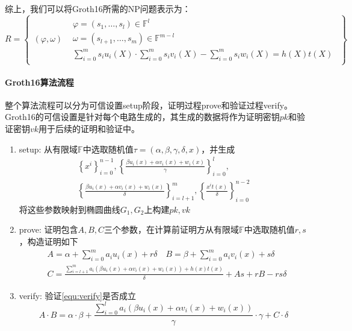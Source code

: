 综上，我们可以将Groth16所需的NP问题表示为：
\begin{equation}
    R = \left \{ \begin{array}{c|l}
        (\varphi, \omega) 
        & \begin{array}{l}
            \varphi = (s_1, \dots, s_l) \in \mathbb{F}^l \\ 
            \omega = (s_{l+1}, \dots, s_m) \in \mathbb{F}^{m-l} \\
            \sum\limits_{i=0}^m s_i u_i(X) \cdot \sum\limits_{i=0}^m s_i v_i(X) - \sum\limits_{i=0}^m s_i w_i(X) = h(X)t(X)
        \end{array}
    \end{array} \right \}
\end{equation}
\paragraph{Groth16算法流程} 整个算法流程可以分为可信设置setup阶段，证明过程prove和验证过程verify。Groth16的可信设置是针对每个电路生成的，其生成的数据将作为证明密钥$pk$和验证密钥$vk$用于后续的证明和验证中。
\begin{enumerate}
    \item setup: 从有限域$\mathbb{F}$中选取随机值$\tau = (\alpha, \beta, \gamma, \delta, x)$，并生成
    \begin{equation}
        \begin{split}
        \left \{x^i \right \}_{i=0}^{n-1}, 
        \left \{ \frac{\beta u_i(x)+\alpha v_i(x) + w_i(x)}{\gamma}\right \}_{i=0}^l, 
        \\
        \left \{ \frac{\beta u_i(x)+\alpha v_i(x) + w_i(x)}{\delta}\right \}_{i=l+1}^m,
        \left \{ \frac{x^i t(x)}{\delta}\right \}_{i=0}^{n-2}
    \end{split}
    \end{equation}
    将这些参数映射到椭圆曲线$G_1, G_2$上构建$pk, vk$
    \item prove: 证明包含$A, B, C$三个参数，在计算前证明方从有限域$\mathbb{F}$中选取随机值$r, s$，构造证明如下
    \begin{equation}
        \begin{split}
        & A = \alpha + \sum \limits_{i=0}^m a_i u_i(x) + r \delta \quad B = \beta + \sum \limits_{i=0}^m a_i v_i(x) + s \delta
        \\
        & C = \frac{\sum \limits_{i=l+1}^m a_i (\beta u_i(x)+\alpha v_i(x) + w_i(x)) + h(x)t(x)}{\delta} + As + rB - rs\delta
    \end{split}
    \end{equation}
    \item verify: 验证\autoref{equ:verify}是否成立
    \begin{equation}
        \label{equ:verify}
        A \cdot B = \alpha \cdot \beta + \frac{\sum \limits_{i=0}^l a_i (\beta u_i(x)+\alpha v_i(x) + w_i(x))}{\gamma} \cdot \gamma + C \cdot \delta
    \end{equation}
    
\end{enumerate}

